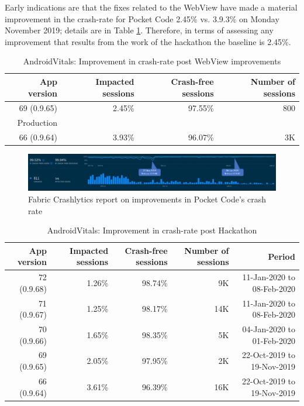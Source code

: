 Early indications are that the fixes related to the WebView have made a material improvement in the crash-rate for Pocket Code 2.45\% vs. 3.9.3\% on Monday  November 2019; details are in Table \ref{tab:androidvitals_rollout_of_0_9_65}. Therefore, in terms of assessing any improvement that results from the work of the hackathon the baseline is 2.45\%.

\begin{table}
    \centering
    \footnotesize
    \begin{tabular}{r|r|r|r}
        App version &Impacted sessions &Crash-free sessions &Number of sessions  \\
        \hline
        69 (0.9.65) &2.45\% &	97.55\% 	&~800 \\
        Production &&& \\
        \hline
        66 (0.9.64) &3.93\% &96.07\% 	&~3K
    \end{tabular}
    \caption{AndroidVitals: Improvement in crash-rate post WebView improvements}
    \label{tab:androidvitals_rollout_of_0_9_65}
\end{table}


\begin{figure}
    \centering
    \includegraphics[width=\linewidth]{images/fabric-crashlytics/annotated_pocketcode_90_day_fabric_crashlytics_report.jpg}
    \caption{Fabric Crashlytics report on improvements in Pocket Code's crash rate}
    \label{fig:annotated_pocketcode_90_day_fabric_crashlytics_report}
\end{figure}

\begin{table}
    \centering
    \footnotesize
    \tabcolsep=0.06cm
    \begin{tabular}{r|r|r|r|r}
    \small
        App version &Impacted sessions &Crash-free sessions &Number of sessions &Period \\
        \hline
        72 (0.9.68) &1.26\% &   98.74\%     &~9K  &11-Jan-2020 to 08-Feb-2020 \\
        71 (0.9.67) &1.25\% &   98.17\%     &~14K &11-Jan-2020 to 08-Feb-2020 \\
        70 (0.9.66) &1.65\% &   98.35\%     &~5K  &04-Jan-2020 to 01-Feb-2020 \\
        69 (0.9.65) &2.05\% &	97.95\% 	&~2K  &22-Oct-2019 to 19-Nov-2019 \\
        \hline
        66 (0.9.64) &3.61\% &   96.39\% 	&~16K &22-Oct-2019 to 19-Nov-2019 \\
    \end{tabular}
    \caption{AndroidVitals: Improvement in crash-rate post Hackathon}
    \label{tab:androidvitals_crashrate_post_hackathon}
\end{table}

